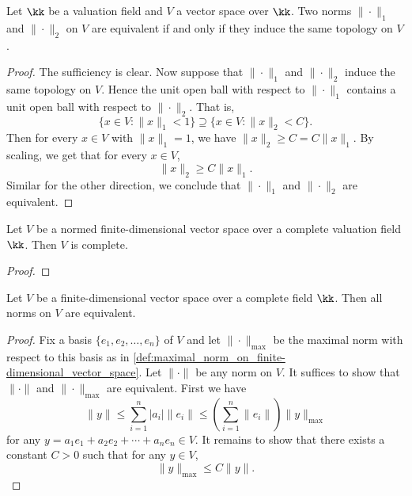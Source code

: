     \begin{lemma}\label{prop:norms_are_equivalent_iff_induces_the_same_topology}
        Let \(\kk\) be a valuation field and \(V\) a vector space over \(\kk\).
        Two norms \(\|\cdot\|_1\) and \(\|\cdot\|_2\) on \(V\) are equivalent if and only if they induce the same topology on \(V\).
    \end{lemma}
    \begin{proof}
        The sufficiency is clear.
        Now suppose that \(\|\cdot\|_1\) and \(\|\cdot\|_2\) induce the same topology on \(V\).
        Hence the unit open ball with respect to \(\|\cdot\|_1\) contains a unit open ball with respect to \(\|\cdot\|_2\).
        That is, 
        \[ \{x \in V : \|x\|_1 < 1\} \supseteq \{x \in V : \|x\|_2 < C\}. \]
        Then for every \(x \in V\) with \(\|x\|_1 = 1\), we have \(\|x\|_2 \geq C = C \|x\|_1\).
        By scaling, we get that for every \(x \in V\),
        \[ \|x\|_2 \geq C \|x\|_1. \]
        Similar for the other direction, we conclude that \(\|\cdot\|_1\) and \(\|\cdot\|_2\) are equivalent.
    \end{proof}

    \begin{proposition}\label{prop:finite_dimensional_vector_space_over_complete_fields_is_complete}
        Let \(V\) be a normed finite-dimensional vector space over a complete valuation field \(\kk\).
        Then \(V\) is complete.
    \end{proposition}
    \begin{proof}
    \end{proof}

    \begin{theorem}\label{prop:norm_on_finite_dimensional_vector_space_are_equivalent}
        Let \(V\) be a finite-dimensional vector space over a complete field \(\kk\).
        Then all norms on \(V\) are equivalent.
    \end{theorem}
    \begin{proof}
        Fix a basis \(\{e_1, e_2, \ldots, e_n\}\) of \(V\) and let \(\|\cdot\|_{\max}\) be the maximal norm with respect to this basis as in \cref{def:maximal_norm_on_finite-dimensional_vector_space}.
        Let \(\|\cdot\|\) be any norm on \(V\).
        It suffices to show that \(\|\cdot\|\) and \(\|\cdot\|_{\max}\) are equivalent.
        First we have 
        \[ \|y\| \leq \sum_{i=1}^n |a_i| \|e_i\| \leq \left(\sum_{i=1}^n \|e_i\|\right) \|y\|_{\max} \]
        for any \(y = a_1 e_1 + a_2 e_2 + \cdots + a_n e_n \in V\).
        It remains to show that there exists a constant \(C > 0\) such that for any \(y \in V\),
        \[ \|y\|_{\max} \leq C \|y\|. \]
    \end{proof}

